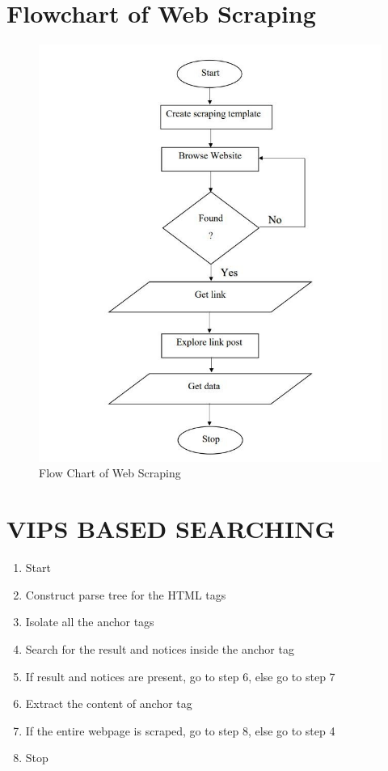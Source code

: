 \section*{Flowchart of Web Scraping}
\begin{figure}[h]
\centering
    \includegraphics[scale=0.7]{images/vips.jpg}
    \caption{Flow Chart of Web Scraping}
    \label{fig:my_label}
\end{figure}
\section*{VIPS BASED SEARCHING}
\begin{enumerate}
\item Start
\item Construct parse tree for the HTML tags
\item Isolate all the anchor tags
\item Search for the result and notices inside the anchor tag
\item If result and notices are present, go to step 6, else go to step 7
\item Extract the content of anchor tag
\item If the entire webpage is scraped, go to step 8, else go to step 4
\item Stop
\end{enumerate}

